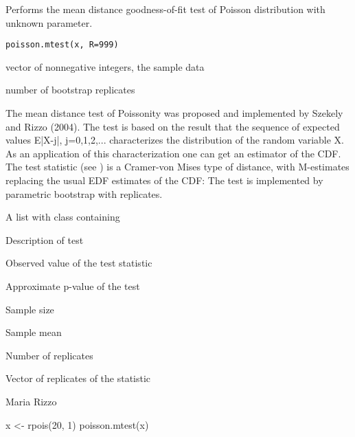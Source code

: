 \documentclass{article}
\begin{document}
\begin{Description}\relax
Performs the mean distance goodness-of-fit test of Poisson distribution
with unknown parameter.
\end{Description}
\begin{Usage}
\begin{verbatim}
poisson.mtest(x, R=999)
\end{verbatim}
\end{Usage}
\begin{Arguments}
\begin{ldescription}
\item[\code{x}] vector of nonnegative integers, the sample data 
\item[\code{R}] number of bootstrap replicates 
\end{ldescription}
\end{Arguments}
\begin{Details}\relax
The mean distance test of Poissonity was proposed and implemented by Szekely and Rizzo (2004). The test is based on the result that the sequence of expected values E|X-j|, j=0,1,2,... characterizes the distribution of the random  variable X. As an application of this characterization one can get an estimator  of the CDF. The test statistic (see ) is a Cramer-von Mises type of distance, with M-estimates replacing the usual EDF estimates of the CDF:
 The test is implemented by parametric bootstrap with  replicates.
\end{Details}
\begin{Value}
A list with class  containing
\begin{ldescription}
\item[\code{method}] Description of test
\item[\code{statistic}] Observed value of the test statistic
\item[\code{p.value}] Approximate p-value of the test
\item[\code{n}] Sample size
\item[\code{lambda}] Sample mean
\item[\code{R}] Number of replicates
\item[\code{replicates}] Vector of replicates of the statistic
\end{ldescription}
\end{Value}
\begin{Author}\relax
Maria Rizzo 
\end{Author}
\begin{SeeAlso}\relax
{}
\end{SeeAlso}
\begin{Examples}
\begin{ExampleCode}
 x <- rpois(20, 1)
 poisson.mtest(x)
 \end{ExampleCode}
\end{Examples}
\end{document}
